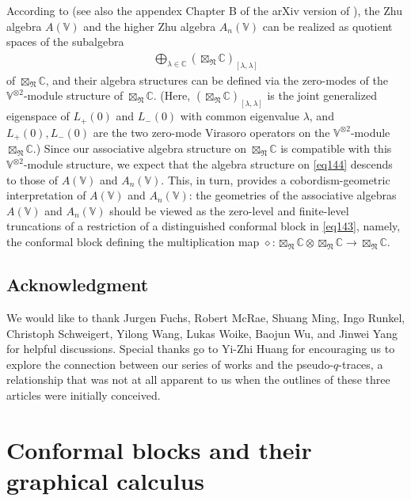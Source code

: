 \documentclass[11pt,b5paper,notitlepage]{article}
\theoremstyle{definition}
\theoremstyle{plain}
\newcommand{\Vbb}{\mathbb V}
\newcommand{\Cbb}{\mathbb C}
\newcommand{\<}{\left\langle}
\renewcommand{\>}{\right\rangle}
\newcommand{\fn}{\mathfrak{N}}
\numberwithin{equation}{section}
\begin{document}
According to \cite{Li-regular-Zhu,Li-regular-AnV} (see also the appendex Chapter B of the arXiv version of \cite{GZ1}), the Zhu algebra $A(\Vbb)$ and the higher Zhu algebra $A_n(\Vbb)$ can be realized as quotient spaces of the subalgebra
\begin{align}\label{eq144}
\bigoplus_{\lambda\in\Cbb}(\boxtimes_\fn\Cbb)_{[\lambda,\lambda]}
\end{align}
of $\boxtimes_\fn\Cbb$, and their algebra structures can be defined via the zero-modes of the $\Vbb^{\otimes2}$-module structure of $\boxtimes_\fn\Cbb$. (Here, $(\boxtimes_\fn\Cbb)_{[\lambda,\lambda]}$ is the joint generalized eigenspace of $L_+(0)$ and $L_-(0)$ with common eigenvalue $\lambda$, and $L_+(0),L_-(0)$ are the two zero-mode Virasoro operators on the $\Vbb^{\otimes2}$-module $\boxtimes_\fn\Cbb$.) Since our associative algebra structure on $\boxtimes_\fn\Cbb$ is compatible with this $\Vbb^{\otimes2}$-module structure, we expect that the algebra structure on \eqref{eq144} descends to those of $A(\Vbb)$ and $A_n(\Vbb)$. This, in turn, provides a cobordism-geometric interpretation of $A(\Vbb)$ and $A_n(\Vbb)$: the geometries of the associative algebras $A(\Vbb)$ and $A_n(\Vbb)$ should be viewed as the zero-level and finite-level truncations of a restriction of a distinguished conformal block in \eqref{eq143}, namely, the conformal block defining the multiplication map $\diamond:\boxtimes_\fn\Cbb\otimes\boxtimes_\fn\Cbb\rightarrow\boxtimes_\fn\Cbb$.





\subsection*{Acknowledgment}

We would like to thank Jurgen Fuchs, Robert McRae, Shuang Ming, Ingo Runkel, Christoph Schweigert, Yilong Wang,  Lukas Woike, Baojun Wu, and Jinwei Yang for helpful discussions. Special thanks go to Yi-Zhi Huang for encouraging us to explore the connection between our series of works \cite{GZ1,GZ2,GZ3} and the pseudo-$q$-traces, a relationship that was not at all apparent to us when the outlines of these three articles were initially conceived.














\section{Conformal blocks and their graphical calculus}
\end{document}
